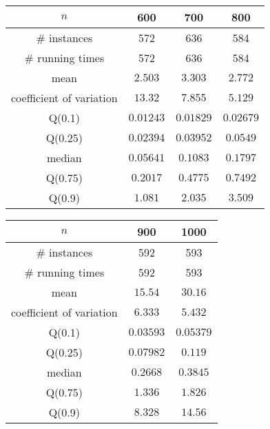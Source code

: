 \begin{tabular}{c|ccc} 
\hline 
$n$ & 600 & 700 & 800 \tabularnewline 
\hline 
\# instances & 572 & 636 & 584 \tabularnewline 
\# running times & 572 & 636 & 584 \tabularnewline 
mean & $2.503$ & $3.303$ & $2.772$ \tabularnewline 
coefficient of variation & $13.32$ & $7.855$ & $5.129$ \tabularnewline 
Q(0.1) & $0.01243$ & $0.01829$ & $0.02679$ \tabularnewline 
Q(0.25) & $0.02394$ & $0.03952$ & $0.0549$ \tabularnewline 
median & $0.05641$ & $0.1083$ & $0.1797$ \tabularnewline 
Q(0.75) & $0.2017$ & $0.4775$ & $0.7492$ \tabularnewline 
Q(0.9) & $1.081$ & $2.035$ & $3.509$ \tabularnewline 
\hline 
\end{tabular} 
\medskip{} 

\begin{tabular}{c|cc} 
\hline 
$n$ & 900 & 1000 \tabularnewline 
\hline 
\# instances & 592 & 593 \tabularnewline 
\# running times & 592 & 593 \tabularnewline 
mean & $15.54$ & $30.16$ \tabularnewline 
coefficient of variation & $6.333$ & $5.432$ \tabularnewline 
Q(0.1) & $0.03593$ & $0.05379$ \tabularnewline 
Q(0.25) & $0.07982$ & $0.119$ \tabularnewline 
median & $0.2668$ & $0.3845$ \tabularnewline 
Q(0.75) & $1.336$ & $1.826$ \tabularnewline 
Q(0.9) & $8.328$ & $14.56$ \tabularnewline 
\hline 
\end{tabular} 
\medskip{} 

